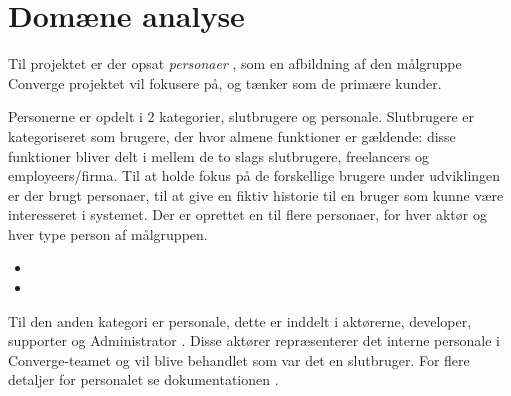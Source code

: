 \section{Domæne analyse}

Til projektet er der opsat \emph{personaer} \cite[Personaer]{converge-terms}, som en afbildning af den målgruppe Converge projektet vil fokusere på, og tænker som de primære kunder.

Personerne er opdelt i 2 kategorier, slutbrugere og personale. Slutbrugere er kategoriseret som brugere, der hvor almene funktioner er gældende: disse funktioner bliver delt i mellem de to slags slutbrugere, freelancers og employeers/firma. Til at holde fokus på de forskellige brugere under udviklingen er der brugt personaer, til at give en fiktiv historie til en bruger som kunne være interesseret i systemet. Der er oprettet en til flere personaer, for hver aktør \cite[Aktør]{converge-terms} og hver type person af målgruppen.

\begin{itemize}
    \item {}
    \item {}
\end{itemize}

Til den anden kategori er personale, dette er inddelt i aktørerne, developer, supporter og Administrator \cite[Personale]{converge-terms}. Disse aktører repræsenterer det interne personale i Converge-teamet og vil blive behandlet som var det en slutbruger. For flere detaljer for personalet se dokumentationen \cite[Funktionelle krav]{documentation-kravspec}. 
